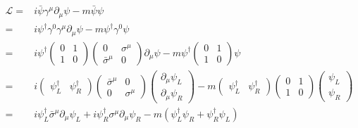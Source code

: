 \begin{align}
\label{eq:200}
  \mathcal{L}=&i\bar{\psi}\gamma^\mu\partial_\mu\psi-m\bar{\psi}\psi\nonumber\\
  =&i\psi^\dagger \gamma^0\gamma^\mu\partial_\mu\psi-m\psi^\dagger \gamma^0 \psi\nonumber\\
  =&i\psi^\dagger  \begin{pmatrix}
    0 & 1\\
    1&0
  \end{pmatrix}
  \begin{pmatrix}
    0 &\sigma^\mu \\
    \bar{\sigma}^\mu&0
  \end{pmatrix}\partial_\mu\psi-m\psi^\dagger
  \begin{pmatrix}
    0 & 1\\
    1&0
  \end{pmatrix}\psi\nonumber\\
=&i\begin{pmatrix}
 \psi_L^\dagger & \psi_R^\dagger
\end{pmatrix}
 \begin{pmatrix}
   \bar{\sigma}^\mu &0\\
   0&\sigma^\mu
 \end{pmatrix} \begin{pmatrix}
   \partial_\mu\psi_L\\
   \partial_\mu\psi_R
 \end{pmatrix}-m
 \begin{pmatrix}
   \psi_L^\dagger&\psi_R^\dagger
 \end{pmatrix}
 \begin{pmatrix}
   0&1\\
   1&0
 \end{pmatrix}
 \begin{pmatrix}
   \psi_L\\ \psi_R
 \end{pmatrix}\nonumber\\
 =& i\psi_L^\dagger \bar{\sigma}^\mu\partial_\mu\psi_L+i\psi_R^\dagger \sigma^\mu\partial_\mu\psi_R
  -m(\psi_L^\dagger \psi_R+\psi_R^\dagger \psi_L)
\end{align}

